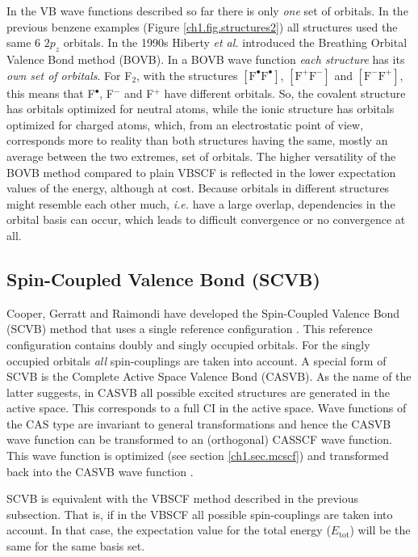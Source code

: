 In the VB wave functions described so far there is only \textit{one} set of orbitals. In the previous benzene examples (Figure \ref{ch1.fig.structures2}) all structures used the same 6 $2p_z$ orbitals. In the 1990s Hiberty \textit{et al.} introduced the Breathing Orbital Valence Bond method (BOVB). In a BOVB wave function \textit{each structure} has its \textit{own set of orbitals}. For F$_2$, with the structures $\mathrm{[F^\bullet F^\bullet]}$, $\mathrm{[F^{+} F^{-}]}$ and $\mathrm{[F^{-} F^{+}]}$, this means that F$^\bullet$, F$^{-}$ and F$^{+}$ have different orbitals. So, the covalent structure has orbitals optimized for neutral atoms, while the ionic structure has orbitals optimized for charged atoms, which, from an electrostatic point of view, corresponds more to reality than both structures having the same, mostly an average between the two extremes, set of orbitals. The higher versatility of the BOVB method compared to plain VBSCF is reflected in the lower expectation values of the energy, although at cost. Because orbitals in different structures might resemble each other much, \textit{i.e.} have a large overlap, dependencies in the orbital basis can occur, which leads to difficult convergence or no convergence at all.

\subsection{\label{ch1.sec.scvb}Spin-Coupled Valence Bond (SCVB)}
Cooper, Gerratt and Raimondi have developed the Spin-Coupled Valence Bond (SCVB) method that uses a single reference configuration \cite{scvb1,scvb2,scvb3}. This reference configuration contains doubly and singly occupied orbitals. For the singly occupied orbitals \textit{all} spin-couplings are taken into account. A special form of SCVB is the Complete Active Space Valence Bond (CASVB). As the name of the latter suggests, in CASVB all possible excited structures are generated in the active space. This corresponds to a full CI in the active space. Wave functions of the CAS type are invariant to general transformations and hence the CASVB wave function can be transformed to an (orthogonal) CASSCF wave function. This wave function is optimized (see section \ref{ch1.sec.mcscf}) and transformed back into the CASVB wave function \cite{thor1,thor2,thor3,thor4}.

SCVB is equivalent with the VBSCF method described in the previous subsection. That is, if in the VBSCF all possible spin-couplings are taken into account. In that case, the expectation value for the total energy ($E_\mathrm{tot}$) will be the same for the same basis set.

